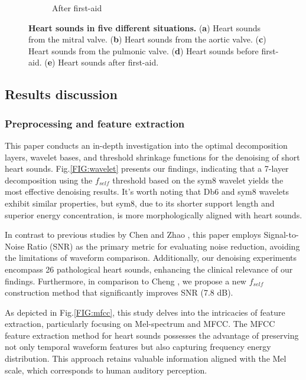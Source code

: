 \begin{figure}[h]
\begin{subfigure}{.4\linewidth}
        \caption{After first-aid}
        \label{FIG:Time&Frequency.e}
    \end{subfigure}
\caption{\textbf{Heart sounds in five different situations.} (\textbf{a}) Heart sounds from the mitral valve. (\textbf{b}) Heart sounds from the aortic valve. (\textbf{c}) Heart sounds from the pulmonic valve. (\textbf{d}) Heart sounds before first-aid. (\textbf{e}) Heart sounds after first-aid.}
\label{FIG:Time&Frequency}
\end{figure}

\subsection{Results discussion}
\subsubsection{Preprocessing and feature extraction}
This paper conducts an in-depth investigation into the optimal decomposition layers, wavelet bases, and threshold shrinkage functions for the denoising of short heart sounds. Fig.\ref{FIG:wavelet} presents our findings, indicating that a 7-layer decomposition using the $f_{self}$ threshold based on the sym8 wavelet yields the most effective denoising results. It's worth noting that Db6 and sym8 wavelets exhibit similar properties, but sym8, due to its shorter support length and superior energy concentration, is more morphologically aligned with heart sounds.

In contrast to previous studies by Chen \cite{2006Research} and Zhao \cite{2010Research}, this paper employs Signal-to-Noise Ratio (SNR) as the primary metric for evaluating noise reduction, avoiding the limitations of waveform comparison. Additionally, our denoising experiments encompass 26 pathological heart sounds, enhancing the clinical relevance of our findings. Furthermore, in comparison to Cheng \cite{cheng2014denoising}, we propose a new $f_{self}$ construction method that significantly improves SNR (7.8 dB).

As depicted in Fig.\ref{FIG:mfcc}, this study delves into the intricacies of feature extraction, particularly focusing on Mel-spectrum and MFCC. The MFCC feature extraction method for heart sounds possesses the advantage of preserving not only temporal waveform features but also capturing frequency energy distribution. This approach retains valuable information aligned with the Mel scale, which corresponds to human auditory perception.

